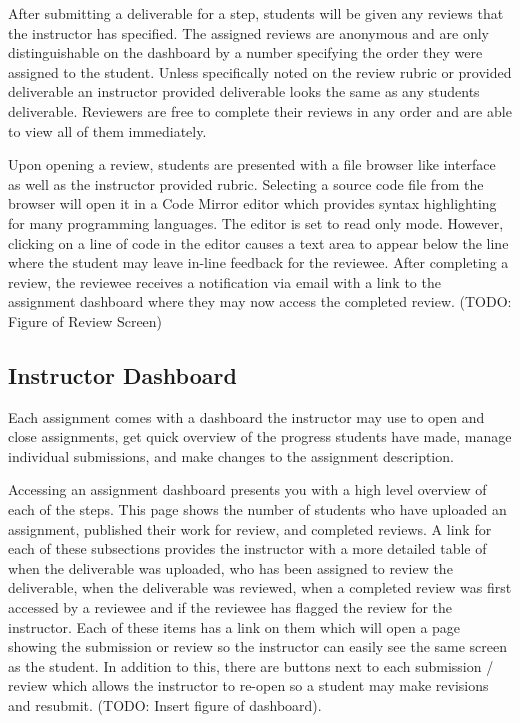 \documentclass{sig-alternate}
\begin{document}
After submitting a deliverable for a step, students will be given any
reviews that the instructor has specified. The assigned reviews are anonymous
and are only distinguishable on the dashboard by a number specifying the order
they were assigned to the student. Unless specifically noted on the review
rubric or provided deliverable an instructor provided deliverable looks the
same as any students deliverable. Reviewers are free to complete their reviews
in any order and are able to view all of them immediately.

Upon opening a review, students are presented with a file browser like
interface as well as the instructor provided rubric. Selecting a source code
file from the browser will open it in a Code Mirror editor which provides
syntax highlighting for many programming languages. The editor is set to read
only mode. However, clicking on a line of code in the editor causes a text
area to appear below the line where the student may leave in-line feedback for
the reviewee. After completing a review, the reviewee receives a notification 
via email with a link to the assignment dashboard where they may now access 
the completed review. (TODO: Figure of Review Screen)

\subsection{Instructor Dashboard}
Each assignment comes with a dashboard the instructor may use to 
open and close assignments, get quick overview of the progress students 
have made, manage individual submissions, and make changes to the assignment
description.

Accessing an assignment dashboard presents you with a high level overview of
each of the steps. This page shows the number of students who have uploaded
an assignment, published their work for review, and completed reviews.
A link for each of these subsections provides the instructor with a more
detailed table of when the deliverable was uploaded, who has been assigned
to review the deliverable, when the deliverable was reviewed, when a completed
review was first accessed by a reviewee and if the reviewee has flagged the
review for the instructor. Each of these items has a link on them which will
open a page showing the submission or review so the instructor can easily
see the same screen as the student. In addition to this, there are buttons
next to each submission / review which allows the instructor to re-open 
so a student may make revisions and resubmit.  
(TODO: Insert figure of dashboard).
\end{document}
